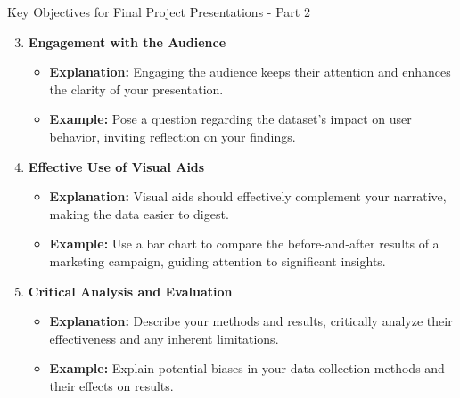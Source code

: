 \documentclass[aspectratio=169]{beamer}
\begin{document}
\begin{frame}[fragile]{Key Objectives for Final Project Presentations - Part 2}
  \begin{enumerate}
    \setcounter{enumi}{2}
    \item \textbf{Engagement with the Audience}
      \begin{itemize}
        \item \textbf{Explanation:} Engaging the audience keeps their attention and enhances the clarity of your presentation. 
        \item \textbf{Example:} Pose a question regarding the dataset's impact on user behavior, inviting reflection on your findings.
      \end{itemize}

    \item \textbf{Effective Use of Visual Aids}
      \begin{itemize}
        \item \textbf{Explanation:} Visual aids should effectively complement your narrative, making the data easier to digest.
        \item \textbf{Example:} Use a bar chart to compare the before-and-after results of a marketing campaign, guiding attention to significant insights.
      \end{itemize}
      
    \item \textbf{Critical Analysis and Evaluation}
      \begin{itemize}
        \item \textbf{Explanation:} Describe your methods and results, critically analyze their effectiveness and any inherent limitations.
        \item \textbf{Example:} Explain potential biases in your data collection methods and their effects on results.
      \end{itemize}
  \end{enumerate}
\end{frame}
\end{document}
